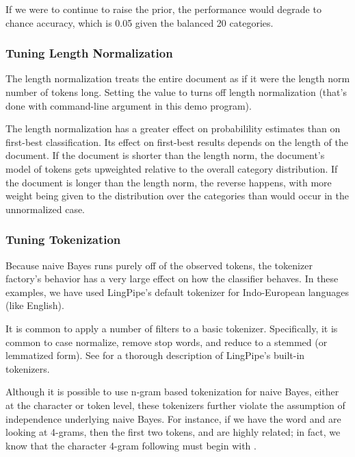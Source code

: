 If we were to continue to raise the prior, the performance
would degrade to chance accuracy, which is 0.05 given the
balanced 20 categories.

\subsubsection{Tuning Length Normalization}

The length normalization treats the entire document as if it were the
length norm number of tokens long.  Setting the value to 
turns off length normalization (that's done with command-line
argument  in this demo program).

The length normalization has a greater effect on probabilility
estimates than on first-best classification.  Its effect on first-best
results depends on the length of the document.  If the document is
shorter than the length norm, the document's model of tokens gets
upweighted relative to the overall category distribution.  If the
document is longer than the length norm, the reverse happens, with
more weight being given to the distribution over the categories than
would occur in the unnormalized case.

\subsubsection{Tuning Tokenization}

Because naive Bayes runs purely off of the observed tokens, the
tokenizer factory's behavior has a very large effect on how the
classifier behaves.  In these examples, we have used LingPipe's
default tokenizer for Indo-European languages (like English).  

It is common to apply a number of filters to a basic tokenizer.
Specifically, it is common to case normalize, remove stop words, and
reduce to a stemmed (or lemmatized form).  See 
for a thorough description of LingPipe's built-in tokenizers.

Although it is possible to use n-gram based tokenization for naive
Bayes, either at the character or token level, these tokenizers
further violate the assumption of independence underlying naive Bayes.
For instance, if we have the word  and are
looking at 4-grams, then the first two tokens, 
and  are highly related; in fact, we know that the
character 4-gram following  must begin with
.


